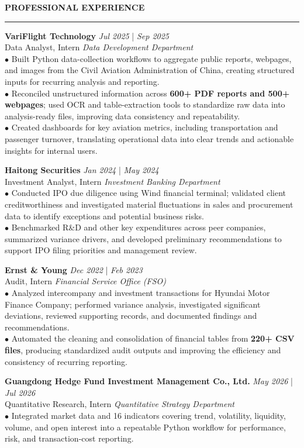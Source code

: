 \documentclass{../original_CV/resume}
\renewcommand{\sectionskip}{\vspace{0.10cm}}
\renewcommand{\sectionlineskip}{\vspace{0.10cm}}
\renewenvironment{rSection}[1]{
\sectionskip
\textcolor{UC San Diego Blue}{\textbf{\large\bfseries\MakeUppercase{#1}}}
\sectionlineskip
\hrule
\begin{list}{}{
\setlength{\leftmargin}{0em}
}
\item[]
}{
\end{list}
}
\begin{document}
\begin{rSection}{PROFESSIONAL EXPERIENCE}
\noindent
\textbf{VariFlight Technology} \hfill {\em Jul 2025} | {\em Sep 2025} \\
Data Analyst, Intern \hfill \textit{Data Development Department}\\[4pt]
$\bullet$ Built Python data-collection workflows to aggregate public reports, webpages, and images from the Civil Aviation Administration of China, creating structured inputs for recurring analysis and reporting.\\[1.5pt]
$\bullet$ Reconciled unstructured information across \textbf{600+ PDF reports and 500+ webpages}; used OCR and table-extraction tools to standardize raw data into analysis-ready files, improving data consistency and repeatability.\\[1.5pt]
$\bullet$ Created dashboards for key aviation metrics, including transportation and passenger turnover, translating operational data into clear trends and actionable insights for internal users.

\textbf{Haitong Securities} \hfill {\em Jan 2024} | {\em May 2024} \\
Investment Analyst, Intern \hfill \textit{Investment Banking Department} \\[4pt]
$\bullet$ Conducted IPO due diligence using Wind financial terminal; validated client creditworthiness and investigated material fluctuations in sales and procurement data to identify exceptions and potential business risks.\\[1.5pt]
$\bullet$ Benchmarked R\&D and other key expenditures across peer companies, summarized variance drivers, and developed preliminary recommendations to support IPO filing priorities and management review.

\textbf{Ernst \& Young} \hfill {\em Dec 2022} | {\em Feb 2023} \\
Audit, Intern \hfill \textit{Financial Service Office (FSO)} \\[4pt]
$\bullet$ Analyzed intercompany and investment transactions for Hyundai Motor Finance Company; performed variance analysis, investigated significant deviations, reviewed supporting records, and documented findings and recommendations.\\[1.5pt]
$\bullet$ Automated the cleaning and consolidation of financial tables from \textbf{220+ CSV files}, producing standardized audit outputs and improving the efficiency and consistency of recurring reporting.

\textbf{Guangdong Hedge Fund Investment Management Co., Ltd.} \hfill {\em May 2026} | {\em Jul 2026} \\
Quantitative Research, Intern \hfill \textit{Quantitative Strategy Department} \\[4pt]
$\bullet$ Integrated market data and 16 indicators covering trend, volatility, liquidity, volume, and open interest into a repeatable Python workflow for performance, risk, and transaction-cost reporting.
\end{rSection}
\end{document}
